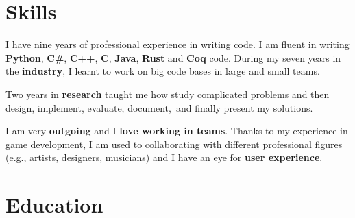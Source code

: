\documentclass[letterpaper]{twentysecondcv} %
\begin{document}

\makeprofile %


\section{Skills}

I have nine years of professional experience in writing code. I am fluent in writing \textbf{Python}, \textbf{C\#}, \textbf{C++}, \textbf{C}, \textbf{Java}, \textbf{Rust} and \textbf{Coq} code. During my seven years in the \textbf{industry}, I learnt to work on big code bases in large and small teams.

Two years in \textbf{research} taught me how study complicated problems and then design, implement, evaluate, document, and finally present my solutions.

I am very \textbf{outgoing} and I \textbf{love working in teams}. Thanks to my experience in game development, I am used to collaborating with different professional figures (e.g., artists, designers, musicians) and I have an eye for \textbf{user experience}.\\





\section{Education}

\begin{twenty} %
\end{twenty}
\end{document}
